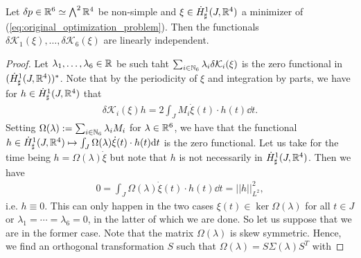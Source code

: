 \begin{proposition}
\label{prop:linearly_independent_constraints}
Let $\delta p \in \mathbb{R}^6 \simeq \bigwedge^2 \mathbb{R}^4$ be non-simple and $\xi \in \dot{H}^{1}_{\sharp}(J, \mathbb{R}^4)$ a minimizer of (\ref{eq:original_optimization_problem}). Then the functionals $\delta \mathcal{K}_1(\xi), \dotsc, \delta \mathcal{K}_6(\xi)$ are linearly independent.
\end{proposition}

\begin{proof}
Let $\lambda_1, \dotsc, \lambda_6 \in \mathbb{R}$ be such taht $\sum_{i \in \mathbb{N}_6} \lambda_i \delta \mathcal{K}_i(\xi) $ is the zero functional in $(\dot{H}^{1}_{\sharp}(J, \mathbb{R}^4))^*$. Note that by the periodicity of $\xi$ and integration by parts, we have for $h \in \dot{H}^{1}_{\sharp}(J, \mathbb{R}^4)$ that
\begin{align}
	\delta \mathcal{K}_i(\xi) h =  2 \int_J M_i \dot{\xi}(t) \cdot h(t) \dd t.
\end{align}
Setting $\Omega(\lambda) := \sum_{i \in \mathbb{N}_6} \lambda_i M_i$ for $\lambda \in \mathbb{R}^6$, we have that the functional $h \in \dot{H}^{1}_{\sharp}(J, \mathbb{R}^4) \mapsto \int_J \Omega(\lambda) \dot{\xi}(t) \cdot h(t) \mathrm{d}t$ is the zero functional. Let us take for the time being $h = \Omega(\lambda) \dot{\xi}$ but note that $h$ is not necessarily in $\dot{H}^{1}_{\sharp}(J, \mathbb{R}^4)$. Then we have
\begin{align}
	0 = \int_J \Omega(\lambda) \dot{\xi}(t) \cdot h(t) \dd t = ||h||_{L^2}^{2},
\end{align}
i.e. $h \equiv 0$. This can only happen in the two cases $\xi(t) \in \ker \Omega(\lambda)$ for all $t \in J$ or $\lambda_1 = \dotsm = \lambda_6 = 0$, in the latter of which we are done. So let us suppose that we are in the former case. Note that the matrix $\Omega(\lambda)$ is skew symmetric. Hence, we find an orthogonal transformation $S$ such that $\Omega(\lambda) = S \Sigma(\lambda) S^T$ with


\end{proof}
